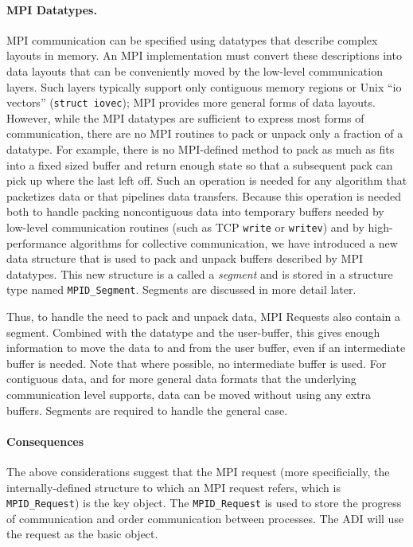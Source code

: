 \documentclass{article}
\def\code#1{\texttt{#1}}
\begin{document}
\paragraph{MPI Datatypes.}
MPI communication can be specified using datatypes that describe
complex layouts in memory.  An MPI implementation must convert these
descriptions into data layouts that can be conveniently moved by the
low-level communication layers.  Such layers typically support only
contiguous memory regions or Unix ``io vectors'' (\code{struct
iovec}); MPI provides more general forms of data layouts.  However,
while the MPI datatypes are sufficient to express most forms of
communication, there are no MPI routines to pack or unpack only a
fraction of a datatype.  For example, there is no MPI-defined method
to pack as much as fits into a fixed sized buffer and return enough
state so that a subsequent pack can pick up where the last left off.
Such an operation is needed for any algorithm that packetizes data or
that pipelines data transfers.  Because this operation is needed both
to handle packing noncontiguous data into temporary buffers needed by
low-level communication routines (such as TCP \code{write} or
\code{writev}) and by high-performance algorithms for collective
communication, we have introduced a new data structure that is used to
pack and unpack buffers described by MPI datatypes.  This new
structure is a called a \emph{segment} and is stored in a structure
type named \code{MPID_Segment}.  Segments are discussed in more detail
later. 

Thus, to handle the need to pack and unpack data, MPI Requests also
contain a segment.  Combined with the datatype and the user-buffer,
this gives enough information to move the data to and from the user
buffer, even if an intermediate buffer is needed.  Note that where
possible, no intermediate buffer is used.  For contiguous data, and
for more general data formats that the underlying communication level
supports, data can be moved without using any extra buffers.  Segments
are required to handle the general case.  

\paragraph{Consequences}
The above considerations suggest that the MPI request (more
specificially, the internally-defined structure to which an MPI
request refers, which is \code{MPID_Request}) is the key object.  The
\code{MPID_Request} is used to store the progress of communication and
order communication between processes.  The ADI will use the request
as the basic object.
\end{document}
